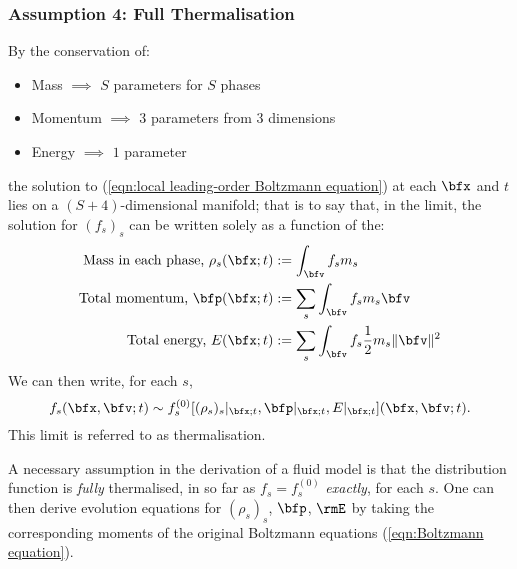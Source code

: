 \subsubsection*{Assumption 4: Full Thermalisation}
    By the conservation of:
    \begin{itemize}
        \item  Mass $\implies$ $S$ parameters for $S$ phases
        \item  Momentum $\implies$ $3$ parameters from $3$ dimensions
        \item  Energy $\implies$ $1$ parameter
    \end{itemize}
    the solution to (\ref{eqn:local leading-order Boltzmann equation}) at each $\bfx$ and $t$ lies on a $(S + 4)$-dimensional manifold; that is to say that, in the limit, the solution for $(f_{s})_{s}$ can be written solely as a function of the:
    \begin{align}
        \text{Mass in each phase, }  \rho_{s}(\bfx; t)  &:=  \int_{\bfv}f_{s}m_{s}  \\
        \text{Total momentum, }  \bfp(\bfx; t)  &:=  \sum_{s}\int_{\bfv}f_{s}m_{s}\bfv  \\
        \text{Total energy, }  E(\bfx; t)  &:=  \sum_{s}\int_{\bfv}f_{s}\frac{1}{2}m_{s}\|\bfv\|^{2}
    \end{align}
    We can then write, for each $s$,
    \begin{equation}
        f_{s}(\bfx, \bfv; t)  \sim  f_{s}^{(0)}[(\rho_{s})_{s}|_{\bfx; t}, \bfp|_{\bfx; t}, E|_{\bfx; t}](\bfx, \bfv; t).
    \end{equation}
    This limit is referred to as thermalisation.
    
    A necessary assumption in the derivation of a fluid model is that the distribution function is \emph{fully} thermalised, in so far as $f_{s}  =  f_{s}^{(0)}$ \emph{exactly}, for each $s$. One can then derive evolution equations for $(\rho_{s})_{s}$, $\bfp$, $\rmE$ by taking the corresponding moments of the original Boltzmann equations (\ref{eqn:Boltzmann equation}).

